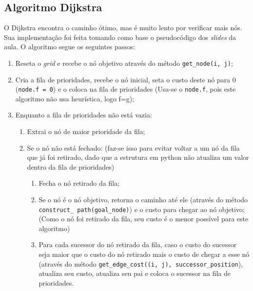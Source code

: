 \documentclass[brazil, 12pt]{article}
\begin{document}
\subsection{Algoritmo Dijkstra}
O Dijkstra encontra o caminho ótimo, mas é muito lento por verificar mais nós. Sua implementação foi feita tomando como base o pseudocódigo dos \textit{slides} da aula. O algoritmo segue os seguintes passos:
\begin{enumerate}
	\item Reseta o \textit{grid} e recebe o nó objetivo através do método \texttt{get\_node(i, j)};
	\item Cria a fila de prioridades, recebe o nó inicial, seta o custo deste nó para 0 (\texttt{node.f = 0}) e o coloca na fila de prioridades \textcolor{blue!70}{(Usa-se o \texttt{node.f}, pois este algoritmo não usa heurística, logo f=g)};
	\item Enquanto a fila de prioridades não está vazia:
	\begin{enumerate}
		\item Extrai o nó de maior prioridade da fila;
		\item Se o nó não está fechado: \textcolor{blue!70}{(faz-se isso para evitar voltar a um nó da fila que já foi retirado, dado que a estrutura em python não atualiza um valor dentro da fila de prioridades)}
		\begin{enumerate}
			\item Fecha o nó retirado da fila;
			\item Se o nó é o nó objetivo, retorna o caminho até ele (através do método \texttt{construct\_ path(goal\_node)}) e o custo para chegar ao nó objetivo; \textcolor{blue!70}{(Como o nó foi retirado da fila, seu custo é o menor possível para este algoritmo)}
			\item Para cada sucessor do nó retirado da fila, caso o custo do sucessor seja maior que o custo do nó retirado mais o custo de chegar a esse nó (através do método \texttt{get\_edge\_cost((i, j), successor\_position}), atualiza seu custo, atualiza seu pai e coloca o sucessor na fila de prioridades.
		\end{enumerate}
	\end{enumerate}
\end{enumerate}
\end{document}
